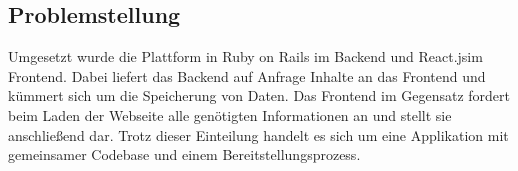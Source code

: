 \subsection{Problemstellung}

Umgesetzt wurde die Plattform in Ruby on Rails im Backend und React.js\footnotemark im Frontend. Dabei liefert das Backend auf Anfrage Inhalte an das Frontend und kümmert sich um die Speicherung von Daten. Das Frontend im Gegensatz fordert beim Laden der Webseite alle genötigten Informationen an und stellt sie anschließend dar. Trotz dieser Einteilung handelt es sich um eine Applikation mit gemeinsamer Codebase und einem Bereitstellungsprozess.


